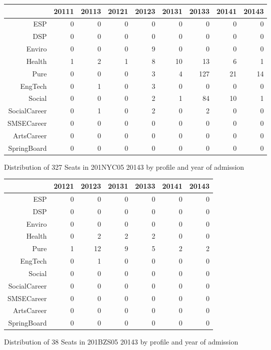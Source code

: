 \documentclass{article}\usepackage[]{graphicx}\usepackage[]{color}
\begin{document}
\begin{figure}[H]
\centering
\begin{tabular}{rrrrrrrrr}
  \hline
 & 20111 & 20113 & 20121 & 20123 & 20131 & 20133 & 20141 & 20143 \\ 
  \hline
ESP &   0 &   0 &   0 &   0 &   0 &   0 &   0 &   0 \\ 
  DSP &   0 &   0 &   0 &   0 &   0 &   0 &   0 &   0 \\ 
  Enviro &   0 &   0 &   0 &   9 &   0 &   0 &   0 &   0 \\ 
  Health &   1 &   2 &   1 &   8 &  10 &  13 &   6 &   1 \\ 
  Pure &   0 &   0 &   0 &   3 &   4 & 127 &  21 &  14 \\ 
  EngTech &   0 &   1 &   0 &   3 &   0 &   0 &   0 &   0 \\ 
  Social &   0 &   0 &   0 &   2 &   1 &  84 &  10 &   1 \\ 
  SocialCareer &   0 &   1 &   0 &   2 &   0 &   2 &   0 &   0 \\ 
  SMSECareer &   0 &   0 &   0 &   0 &   0 &   0 &   0 &   0 \\ 
  ArtsCareer &   0 &   0 &   0 &   0 &   0 &   0 &   0 &   0 \\ 
  SpringBoard &   0 &   0 &   0 &   0 &   0 &   0 &   0 &   0 \\ 
   \hline
\end{tabular}
\caption{Distribution of 327 Seats in 201NYC05 20143 by profile and year of admission} 
\end{figure}
\begin{figure}[H]
\centering
\begin{tabular}{rrrrrrr}
  \hline
 & 20121 & 20123 & 20131 & 20133 & 20141 & 20143 \\ 
  \hline
ESP &   0 &   0 &   0 &   0 &   0 &   0 \\ 
  DSP &   0 &   0 &   0 &   0 &   0 &   0 \\ 
  Enviro &   0 &   0 &   0 &   0 &   0 &   0 \\ 
  Health &   0 &   2 &   2 &   2 &   0 &   0 \\ 
  Pure &   1 &  12 &   9 &   5 &   2 &   2 \\ 
  EngTech &   0 &   1 &   0 &   0 &   0 &   0 \\ 
  Social &   0 &   0 &   0 &   0 &   0 &   0 \\ 
  SocialCareer &   0 &   0 &   0 &   0 &   0 &   0 \\ 
  SMSECareer &   0 &   0 &   0 &   0 &   0 &   0 \\ 
  ArtsCareer &   0 &   0 &   0 &   0 &   0 &   0 \\ 
  SpringBoard &   0 &   0 &   0 &   0 &   0 &   0 \\ 
   \hline
\end{tabular}
\caption{Distribution of 38 Seats in 201BZS05 20143 by profile and year of admission} 
\end{figure}
\end{document}
